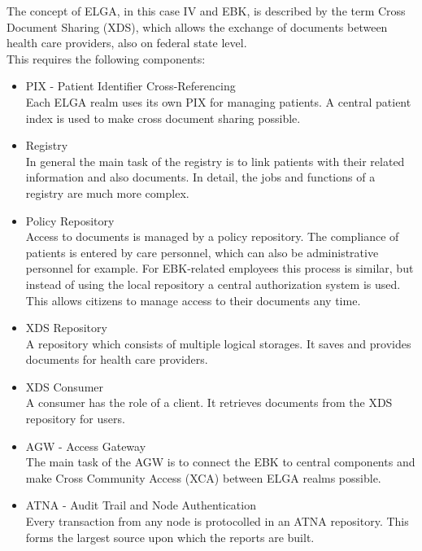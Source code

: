 \documentclass[a4paper]{article}
\begin{document}
	The concept of ELGA, in this case IV and EBK, is described by the term Cross Document Sharing
	(XDS), which allows the exchange of documents between health care providers,
	also on federal state level.\\
	This requires the following components:\\
	\begin{itemize}
	    	\item PIX - Patient Identifier Cross-Referencing\\
	    	Each ELGA realm uses its own PIX for managing patients. A central patient index is used to
	    	make cross document sharing possible.
	    	\item Registry\\
	    	In general the main task of the registry is to link patients with their
	    	related information and also documents.
	    	In detail, the jobs and functions of a registry are much more complex.
	    	\item Policy Repository\\
	    	Access to documents is managed  by a policy repository. The compliance of patients is entered
	    	by care personnel, which can also be administrative personnel for example.
	    	For EBK-related employees this process is similar, but instead of using
	    	the local repository a central authorization system is used. This allows citizens to manage access to their documents any time.
	    	\item XDS Repository\\
	    	A repository which consists of multiple logical storages. It saves and provides documents
	    	for health care providers.
	    	\item XDS Consumer\\
	    	A consumer has the role of a client. It retrieves documents from the XDS
	    	repository for users.
	    	\item AGW - Access Gateway\\
	    	The main task of the AGW is to connect the EBK to central components and
	    	make Cross Community Access (XCA) between ELGA realms possible.
	    	\item ATNA - Audit Trail and Node Authentication\\
	    	Every transaction from any node is protocolled in an ATNA repository.
	    	This forms the largest source upon which the reports are built.
	    	
	 \end{itemize}
	
\end{document}
